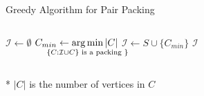 \begin{frame}{Greedy Algorithm for Pair Packing}
\begin{columns}[T]

\begin{column}{.5\linewidth}


\begin{algorithm}[H]
\caption{Greedy Algorithm}
\begin{algorithmic}[1]
\STATE $\mathcal{I} \gets \emptyset$
\STATE
$C_{min} \gets \smashoperator{\argmin\limits_{\{C : \mathcal{I} \cup C\} \text{ is a packing }\}}}|C|$
\STATE $\mathcal{I} \gets S \cup \{ C_{min} \}$
\ENDWHILE
\RETURN $\mathcal{I}$
\end{algorithmic}
\end{algorithm}

\end{column}\hfill\begin{column}{.5\linewidth}

\addtocounter{algorithm}{-1}


\end{column}\end{columns}
\vfill
* $|C|$ is the number of vertices in $C$
\end{frame}